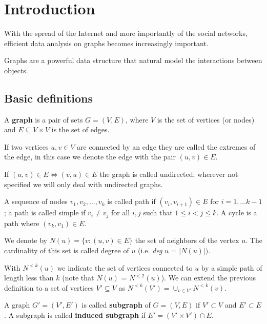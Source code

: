 \chapter{Introduction}

With the spread of the Internet and more importantly of the social networks, efficient data analysis on graphs becomes increasingly important. 

Graphs are a powerful data structure that natural model the interactions between objects.

\section{Basic definitions}

\begin{definizione}\label{def:graph}
	A \textbf{graph} is a pair of sets $G=(V,E)$, where $V$ is the set of vertices (or nodes) and $E \subseteq V \times V$ is the set of edges.
\end{definizione}

If two vertices $u, v \in V$ are connected by an edge they are called the extremes of the edge, in this case we denote the edge with the pair $(u, v) \in E$.

If $(u,v) \in E \Leftrightarrow (v,u) \in E$ the graph is called undirected; wherever not specified we will only deal with undirected graphs.

A sequence of nodes  $v_{1}, v_{2}, \ldots, v_{k}$ is called path if $(v_{i}, v_{i+1}) \in E$ for $i = 1, \ldots k-1$; a path is called simple if $v_{i} \neq v_{j}$ for all $i,j$ such that $1 \leq i < j \leq k$. A cycle is a path where $(v_{k}, v_{1}) \in E$.

We denote by $N(u) = \{ v : (u,v) \in E \}$ the set of neighbors of the vertex $u$. The cardinality of this set is called degree of $u$ (i.e. \textit{deg} $u$ = $|N(u)|)$. 

With $N^{<k}(u)$ we indicate the set of vertices connected to $u$ by a simple path of length less than $k$ (note that $N(u)$ = $N^{<2}(u)$). We can extend the previous definition to a set of vertices $V' \subseteq V$ as $N^{<k}(V') = \cup_{v \in V'}{ N^{<k}(v) }$.

\begin{definizione}\label{def:subgraph}
	A graph $G' = (V', E')$ is called \textbf{subgraph} of $G=(V,E)$ if $V' \subset V$ and $E' \subset E$. A subgraph is called \textbf{induced subgraph} if $E' = (V' \times V') \cap E$.
\end{definizione}

